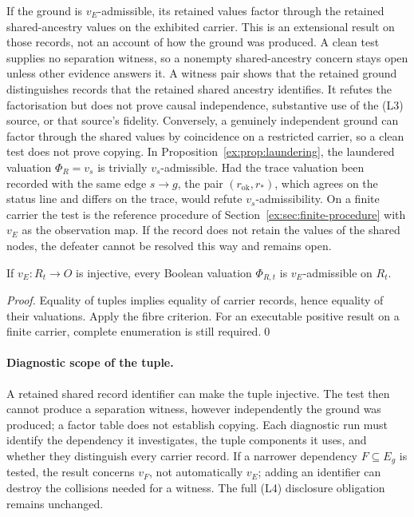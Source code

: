 \documentclass[smallextended,envcountsect,envcountsame,natbib]{svjour3}
\begin{document}
If the ground is $v_E$-admissible, its retained values factor through the retained shared-ancestry values on the exhibited carrier. This is an extensional result on those records, not an account of how the ground was produced. A clean test supplies no separation witness, so a nonempty shared-ancestry concern stays open unless other evidence answers it. A witness pair shows that the retained ground distinguishes records that the retained shared ancestry identifies. It refutes the factorisation but does not prove causal independence, substantive use of the (L3) source, or that source's fidelity. Conversely, a genuinely independent ground can factor through the shared values by coincidence on a restricted carrier, so a clean test does not prove copying. In Proposition~\ref{ex:prop:laundering}, the laundered valuation $\Phi_R=v_s$ is trivially $v_s$-admissible. Had the trace valuation been recorded with the same edge $s\to g$, the pair $(r_{\mathrm{ok}},r_*)$, which agrees on the status line and differs on the trace, would refute $v_s$-admissibility. On a finite carrier the test is the reference procedure of Section~\ref{ex:sec:finite-procedure} with $v_E$ as the observation map. If the record does not retain the values of the shared nodes, the defeater cannot be resolved this way and remains open.

\begin{proposition}\label{ex:prop:injective-tuple}
If $v_E:R_t\to O$ is injective, every Boolean valuation $\Phi_{R,t}$ is $v_E$-admissible on $R_t$.
\end{proposition}
\begin{proof}
Equality of tuples implies equality of carrier records, hence equality of their valuations. Apply the fibre criterion. For an executable positive result on a finite carrier, complete enumeration is still required.\qed
\end{proof}

\paragraph{Diagnostic scope of the tuple.} A retained shared record identifier can make the tuple injective. The test then cannot produce a separation witness, however independently the ground was produced; a factor table does not establish copying. Each diagnostic run must identify the dependency it investigates, the tuple components it uses, and whether they distinguish every carrier record. If a narrower dependency $F\subseteq E_g$ is tested, the result concerns $v_F$, not automatically $v_E$; adding an identifier can destroy the collisions needed for a witness. The full (L4) disclosure obligation remains unchanged.
\end{document}
